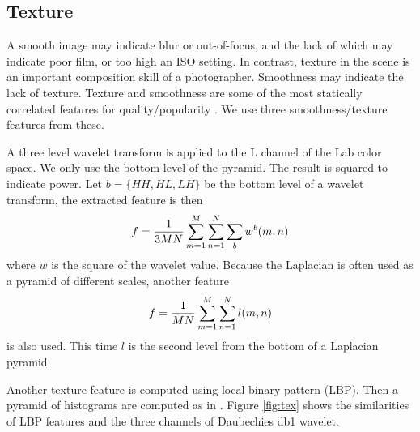 \documentclass[conference,a4paper]{IEEEtran}
\begin{document}
  \subsection{Texture}
  A smooth image may indicate blur or out-of-focus, and the lack of which may indicate poor film, or too high an ISO setting.  In contrast, texture in the scene is an important composition skill of a photographer.  Smoothness may indicate the lack of texture.  Texture and smoothness are some of the most statically correlated features for quality/popularity \cite{wang2015automatic} \cite{khosla2014makes}.  We use three smoothness/texture features from these.

  A three level wavelet transform is applied to the L channel of the Lab color space.  We only use the bottom level of the pyramid.  The result is squared to indicate power.  Let $b = \{HH, HL, LH\}$ be the bottom level of a wavelet transform, the extracted feature is then
  \begin{equation}
    f = {1\over 3MN} \sum_{m=1}^{M}\sum_{n=1}^{N}\sum_{b}w^b(m, n)
  \end{equation}
  where $w$ is the square of the wavelet value.  Because the Laplacian is often used as a pyramid of different scales, another feature
  \begin{equation}
    f = {1\over MN} \sum_{m=1}^{M}\sum_{n=1}^{N}l(m, n)
  \end{equation} is also used.  This time $l$ is the second level from the bottom of a Laplacian pyramid.

  Another texture feature is computed using local binary pattern (LBP).  Then a pyramid of histograms are computed as in \cite{lazebnik2006beyond}.  Figure \ref{fig:tex} shows the similarities of LBP features and the three channels of Daubechies db1 wavelet.
\end{document}
